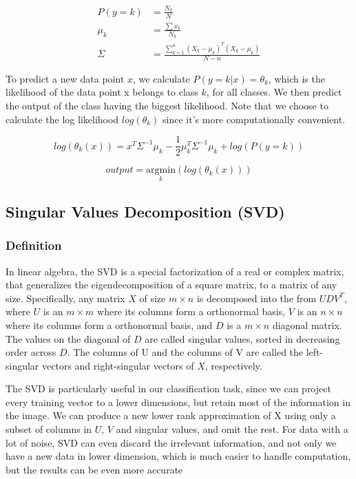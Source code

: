 \documentclass[12,]{article}
\begin{document}
\[\begin{aligned}
P(y=k) & = \frac{N_k}{N} \\
\mu_k & = \frac{\sum x_k}{N_k} \\
\Sigma & = \frac{\sum_{k=1}^n (X_k - \mu_k)^T (X_k - \mu_k)}{N - n}
\end{aligned}\]

To predict a new data point \(x\), we calculate \(P(y=k|x) = \theta_k\),
which is the likelihood of the data point x belongs to class \(k\), for
all classes. We then predict the output of the class having the biggest
likelihood. Note that we choose to calculate the log likelihood
\(log(\theta_k)\) since it's more computationally convenient.

\[
log(\theta_k(x)) = x^T \Sigma^{-1} \mu_k - \frac{1}{2}\mu_k^T \Sigma^{-1} \mu_k + log(P(y=k))
\]

\[
output = \underset{k}{\mathrm{argmin}}(log(\theta_k(x)))
\]

\hypertarget{singular-values-decomposition-svd}{%
\subsection{Singular Values Decomposition
(SVD)}\label{singular-values-decomposition-svd}}

\hypertarget{definition}{%
\subsubsection{Definition}\label{definition}}

In linear algebra, the SVD \cite{svd} is a special factorization of a
real or complex matrix, that generalizes the eigendecomposition of a
square matrix, to a matrix of any size. Specifically, any matrix \(X\)
of size \(m \times n\) is decomposed into the from \(UDV^T\), where
\(U\) is an \(m \times m\) where its columns form a orthonormal basis,
\(V\) is an \(n \times n\) where its columns form a orthonormal basis,
and \(D\) is a \(m \times n\) diagonal matrix. The values on the
diagonal of \(D\) are called singular values, sorted in decreasing order
across \(D\). The columns of U and the columns of V are called the
left-singular vectors and right-singular vectors of \(X\), respectively.

The SVD is particularly useful in our classification task, since we can
project every training vector to a lower dimensions, but retain most of
the information in the image. We can produce a new lower rank
approximation of X using only a subset of columns in \(U\), \(V\) and
singular values, and omit the rest. For data with a lot of noise, SVD
can even discard the irrelevant information, and not only we have a new
data in lower dimension, which is much easier to handle computation, but
the results can be even more accurate
\end{document}
